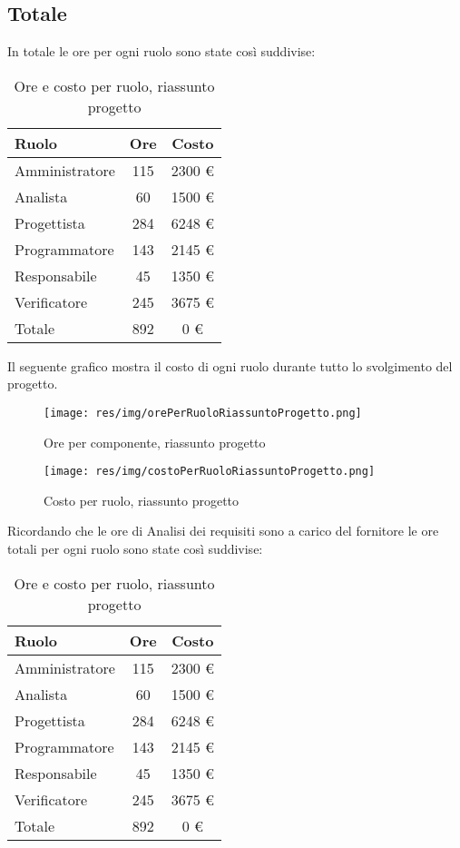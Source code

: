 \subsection{Totale}
In totale le ore per ogni ruolo sono state così suddivise:

\begin{table}[H]
	\centering
	\begin{tabular}{ l c c }
		\textbf{Ruolo} & \textbf{Ore} & \textbf{Costo} \\
		\hline
		Amministratore & 115 & 2300 \euro \\
		Analista & 60 & 1500 \euro \\
		Progettista & 284 & 6248 \euro \\
		Programmatore & 143 & 2145 \euro \\
		Responsabile & 45 & 1350 \euro \\
		Verificatore & 245 & 3675 \euro \\
		\hline
		Totale & 892 & 0 \euro \\
		\hline
	\end{tabular}
	\caption{Ore e costo per ruolo, riassunto progetto}
\end{table}

Il seguente grafico mostra il costo di ogni ruolo durante tutto lo svolgimento del progetto.

\begin{figure}[H]
  \begin{center}
    \texttt{[image: res/img/orePerRuoloRiassuntoProgetto.png]}
  \caption{Ore per componente, riassunto progetto}
  \end{center} 
\end{figure}  

\begin{figure}[H]
  \begin{center}
    \texttt{[image: res/img/costoPerRuoloRiassuntoProgetto.png]}
  \caption{Costo per ruolo, riassunto progetto}
  \end{center} 
\end{figure}  


Ricordando che le ore di Analisi dei requisiti sono a carico del fornitore le ore totali per ogni ruolo sono state così suddivise:
\begin{table}[H]
	\centering
	\begin{tabular}{ l c c }
		\textbf{Ruolo} & \textbf{Ore} & \textbf{Costo} \\
		\hline
		Amministratore & 115 & 2300 \euro \\
		Analista & 60 & 1500 \euro \\
		Progettista & 284 & 6248 \euro \\
		Programmatore & 143 & 2145 \euro \\
		Responsabile & 45 & 1350 \euro \\
		Verificatore & 245 & 3675 \euro \\
		\hline
		Totale & 892 & 0 \euro \\
		\hline
	\end{tabular}
	\caption{Ore e costo per ruolo, riassunto progetto}
\end{table}

